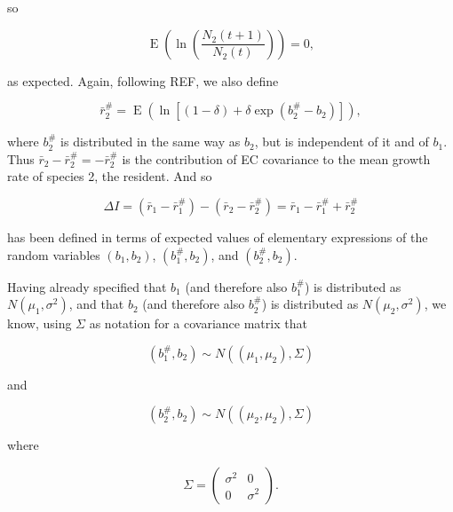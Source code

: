 \documentclass[letterpaper,11pt]{article}
\DeclareMathOperator{\EX}{E}%
\begin{document}
\noindent so

\begin{equation}
\EX(\ln (\frac{N_2(t+1)}{N_2(t)}))=0, \label{r2_is_zero}
\end{equation}

\noindent as expected. 
Again, following REF, we also define

\begin{equation}
\bar r_2^\#=\EX(\ln [(1-\delta)+\delta \exp(b_2^\#-b_2)]),  \label{rbar2sharp_E}
\end{equation}

\noindent where $b_2^\#$ is distributed in the same way as $b_2$, but is independent of it and of $b_1$. 
Thus $\bar r_2- \bar r_2^\# = -\bar r_2^\#$ is the contribution of EC covariance to the mean growth rate of species 2, the resident. 
And so

\begin{equation}
\Delta I=\left(\bar r_1 - \bar r_1^\#\right)-\left(\bar r_2- \bar r_2^\#\right)=\bar r_1 - \bar r_1^\#+\bar r_2^\#  \label{DeltaI}
\end{equation}

\noindent has been defined in terms of expected values of elementary expressions of the random variables $\left(b_1,b_2\right)$, $\left(b_1^\#,b_2\right)$, and $\left(b_2^\#, b_2\right)$.

Having already specified that $b_1$ (and therefore also $b_1^\#$) is distributed as $N\left(\mu_1, \sigma^2\right)$, and that $b_2$ (and therefore also $b_2^\#$) is distributed as $N\left(\mu_2, \sigma^2\right)$, we know, using $\Sigma$ as notation for a covariance matrix that

\begin{equation}
\left(b_1^\#, b_2\right) \sim N\left((\mu_1,\mu_2),\Sigma \right) \label{b1sharpb2_distribution}
\end{equation}

\noindent and 

\begin{equation}
\left(b_2^\#, b_2\right) \sim N(( \mu_2,\mu_2), \Sigma) \label{b2sharpb2_distribution}
\end{equation}

\noindent where

\begin{equation}
\Sigma = \begin{pmatrix} \sigma^2&0\\0&\sigma^2\end{pmatrix}. \label{Sigmamat_cov0}
\end{equation}
\end{document}
